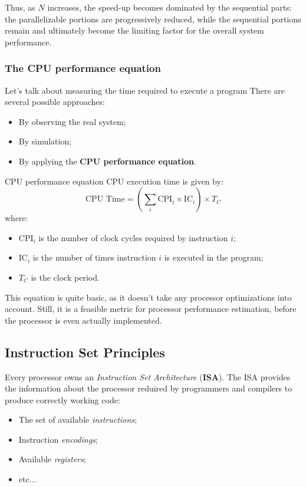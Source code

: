 \documentclass[a4paper,11pt]{article}
\begin{document}
Thus, as $N$ increases, the speed-up becomes dominated by the sequential parts: the parallelizable portions are progressively reduced, while the sequential portions remain and ultimately become the limiting factor for the overall system performance.

\subsubsection{The CPU performance equation}

Let's talk about measuring the time required to
execute a program
There are several possible approaches:
\begin{itemize}
\item By observing the real system;
\item By simulation;
\item By applying the \textbf{CPU performance equation}.
\end{itemize}

\begin{definition}{CPU performance equation}
CPU execution time is given by:
$$
\text{CPU Time} = \left( \sum_i \text{CPI}_i \times \text{IC}_i \right) \times T_C
$$
where:
\begin{itemize}
	\item $\text{CPI}_i$ is the number of clock cycles required by instruction $i$;
	\item $\text{IC}_i$ is the number of times instruction $i$ is executed in the program;
	\item $T_C$ is the clock period.
\end{itemize}
\end{definition}

This equation is quite basic, as it doesn't take any processor optimizations into account.
Still, it is a feasible metric for processor performance estimation, before the processor is even actually implemented.

\subsection{Instruction Set Principles}

Every processor owns an \textit{Instruction Set Architecture} (\textbf{ISA}).
The ISA provides the information about the processor reduired by programmers and
compilers to produce correctly working code:
\begin{itemize}
	\item The set of available \textit{instructions};
	\item Instruction \textit{encodings};
	\item Available \textit{registers};
	\item etc...
\end{itemize}
\end{document}
